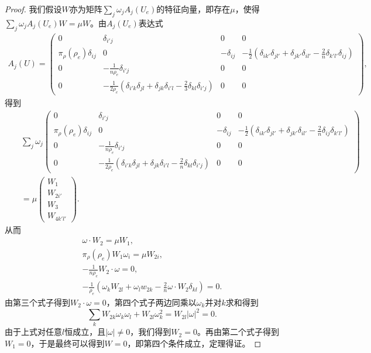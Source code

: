 \begin{proof}
	我们假设$W$亦为矩阵$\sum_j \omega_j A_j(U_e)$的特征向量，即存在$\mu$，使得$\sum_j \omega_j A_j(U_e) W = \mu W$。由$A_j(U_e)$表达式
	\begin{eqnarray*}
	    A_{j}(U) =
 		\left( \begin{smallmatrix} 
 		0 & \delta_{i'j} & 0 & 0  \\
 		\pi_\rho(\rho_e) \delta_{ij} & 0  &  - \delta_{ij} & -\frac{1}{2}(\delta_{ik'}\delta_{jl'} + \delta_{jk'} \delta_{il'} - \frac{2}{n} \delta_{k'l'}\delta_{ij}) \\
 		0 & - \frac{1}{n \rho_e} \delta_{i'j} & 0 & 0 \\
 		0 & -\frac{1}{2\rho_e}(\delta_{i'k}\delta_{jl} + \delta_{jk} \delta_{i'l} - \frac{2}{3} \delta_{kl} \delta_{i'j}) & 0 & 0
 		\end{smallmatrix} \right),
 	\end{eqnarray*}
	得到
	\begin{eqnarray*}
		&& \sum_j \omega_j \left( \begin{smallmatrix} 
 		0 & \delta_{i'j} & 0 & 0  \\
 		\pi_\rho(\rho_e) \delta_{ij} & 0  &  - \delta_{ij} & -\frac{1}{2}(\delta_{ik'}\delta_{jl'} + \delta_{jk'} \delta_{il'} - \frac{2}{n} \delta_{ij} \delta_{k'l'}) \\
 		0 & - \frac{1}{n \rho_e} \delta_{i'j} & 0 & 0 \\
 		0 & -\frac{1}{2\rho_e}(\delta_{i'k}\delta_{jl} + \delta_{jk} \delta_{i'l} - \frac{2}{n} \delta_{kl} \delta_{i'j}) & 0 & 0
 		\end{smallmatrix} \right) \\
 		&& = \mu \left( \begin{array}{c} W_1 \\ W_{2i'} \\W_{3} \\W_{4k'l'} \end{array} \right).
	\end{eqnarray*}
	从而
	\begin{eqnarray*}
		\omega \cdot W_2 = \mu W_1, \\ 
		\pi_{\rho}(\rho_e) W_1 \omega_{i} =\mu W_{2i}, \\
		-\frac{1}{n \rho_e} W_2 \cdot \omega  = 0, \\
		-\frac{1}{\rho_e} (\omega_{k}  W_{2l} +  \omega_{l} w_{2k} - \frac{2}{n} \omega \cdot W_2 \delta_{kl}) = 0.
	\end{eqnarray*}
	由第三个式子得到$W_2 \cdot \omega = 0$，第四个式子两边同乘以$\omega_k$并对$k$求和得到
	\begin{equation*} \label{eq:Womega}
		\sum_k W_{2k} \omega_k \omega_l + W_{2l} \omega_k^2 = W_{2l} |\omega|^2=0.
	\end{equation*}
	由于上式对任意$l$恒成立，且$|\omega| \neq 0$，我们得到$W_2 = 0$。再由第二个式子得到$W_1=0$，于是最终可以得到$W=0$，即第四个条件成立，定理得证。
	\end{proof}

